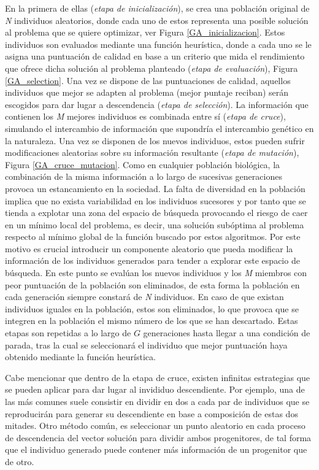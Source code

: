 \documentclass{uathesis-es}
\begin{document}
{	En la primera de ellas (\textit{etapa de inicialización}), se crea una población original de \textit{N} individuos aleatorios, donde cada uno de estos representa una posible solución al problema que se quiere optimizar, ver Figura \ref{GA_inicializacion}. Estos individuos son evaluados mediante una función heurística, donde a cada uno se le asigna una puntuación de calidad en base a un criterio que mida el rendimiento que ofrece dicha solución al problema planteado (\textit{etapa de evaluación}), Figura \ref{GA_selection}. Una vez se dispone de las puntuaciones de calidad, aquellos individuos que mejor se adapten al problema (mejor puntaje reciban) serán escogidos para dar lugar a descendencia (\textit{etapa de selección}). La información que contienen los \textit{M} mejores individuos es combinada entre sí (\textit{etapa de cruce}), simulando el intercambio de información que supondría el intercambio genético en la naturaleza. Una vez se disponen de los nuevos individuos, estos pueden sufrir modificaciones aleatorias sobre su información resultante (\textit{etapa de mutación}), Figura \ref{GA_cruce_mutacion}. Como en cualquier población biológica, la combinación  de la misma información a lo largo de sucesivas generaciones provoca un estancamiento en la sociedad. La falta de diversidad en la población implica que no exista variabilidad en los individuos sucesores y por tanto que se tienda a explotar una zona del espacio de búsqueda provocando el riesgo de caer en un mínimo local del problema, es decir, una solución subóptima al problema respecto al mínimo global de la función buscado por estos algoritmos. Por este motivo es crucial introducir un componente aleatorio que pueda modificar la información de los individuos generados para tender a explorar este espacio de búsqueda. En este punto se evalúan los nuevos individuos y los \textit{M} miembros con peor puntuación de la población son eliminados, de esta forma la población en cada generación siempre constará de \textit{N} individuos. En caso de que existan individuos iguales en la población, estos son eliminados, lo que provoca que se integren en la población el mismo número de los que se han descartado. Estas etapas son repetidas a lo largo de $G$ generaciones hasta llegar a una condición de parada, tras la cual se seleccionará el individuo que mejor puntuación haya obtenido mediante la función heurística.
	
	Cabe mencionar que dentro de la etapa de cruce, existen infinitas estrategias que se pueden aplicar para dar lugar al invididuo descendiente. Por ejemplo, una de las más comunes suele consistir en dividir en dos a cada par de individuos que se reproducirán para generar su descendiente en base a composición de estas dos mitades. Otro método común, es seleccionar un punto aleatorio en cada proceso de descendencia del vector solución para dividir ambos progenitores, de tal forma que el individuo generado puede contener más información de un progenitor que de otro.
	
}
\end{document}
